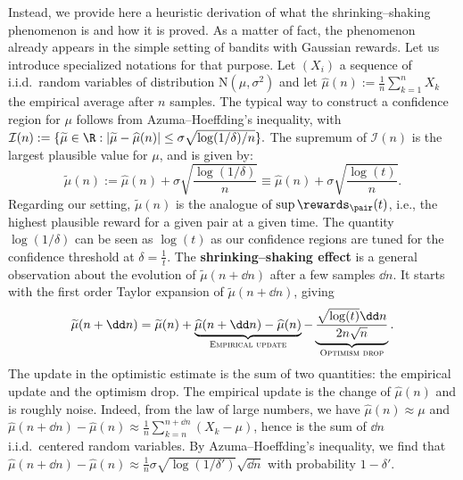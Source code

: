 \documentclass[preprint,cleveref,12pt]{colt2025}
\DeclarePairedDelimiter{\braces}{\{}{\}}	%
\DeclarePairedDelimiter{\abs}{\lvert}{\rvert}	%
\newcommand{\strong}[1]{\textbf{#1}}
\begin{document}
    Instead, we provide here a heuristic derivation of what the shrinking--shaking phenomenon is and how it is proved. 
    As a matter of fact, the phenomenon already appears in the simple setting of bandits with Gaussian rewards. 
    Let us introduce specialized notations for that purpose. 
    Let $(X_i)$ a sequence of i.i.d.~random variables of distribution $\mathrm{N}(\mu, \sigma^2)$ and let $\widehat{\mu}(n) := \frac 1n \sum_{k=1}^n X_k$ the empirical average after $n$ samples. 
    The typical way to construct a confidence region for $\mu$ follows from Azuma--Hoeffding's inequality, with
    $
        \mathcal{I}(n) 
        :=
        \braces{
            \widetilde{\mu} \in \R
            :
            \abs*{\widetilde{\mu} - \widehat{\mu}(n)}
            \le
            \sigma \sqrt{{\log(1/\delta)}/{n}}
        }
        .
    $
    The supremum of $\mathcal{I}(n)$ is the largest plausible value for $\mu$, and is given by:
    \begin{equation}
    \label{equation_ucb_index}
        \widetilde{\mu}(n) 
        := 
        \widehat{\mu}(n) + \sigma \sqrt{\frac{\log(1/\delta)}n}
        \equiv
        \widehat{\mu}(n) + \sigma \sqrt{\frac{\log(t)}n}
        .
    \end{equation}
    Regarding our setting, $\widetilde{\mu}(n)$ is the analogue of $\sup \rewards_\pair(t)$, i.e., the highest plausible reward for a given pair at a given time. 
    The quantity $\log(1/\delta)$ can be seen as $\log(t)$ as our confidence regions are tuned for the confidence threshold at $\delta = \frac 1t$.
    The \strong{shrinking--shaking effect} is a general observation about the evolution of $\widetilde{\mu}(n + \dd n)$ after a few samples $\dd n$. 
    It starts with the first order Taylor expansion of $\widetilde{\mu}(n + \dd n)$, giving
    \begin{equation}
    \label{equation_ucb_update}
        \widetilde{\mu}(n + \dd n)
        =
        \widetilde{\mu}(n) 
        + 
        \underbrace{
            \widehat{\mu}(n + \dd n) - \widehat{\mu}(n)
        }_{\textsc{Empirical update}}
        - 
        \underbrace{
            \frac{\sqrt{\log(t)} \dd n}{2 n \sqrt{n}}
        }_{\textsc{Optimism drop}}
        .
    \end{equation}
    The update in the optimistic estimate is the sum of two quantities: the empirical update and the optimism drop. 
    The empirical update is the change of $\widehat{\mu}(n)$ and is roughly noise. 
    Indeed, from the law of large numbers, we have $\widehat{\mu}(n) \approx \mu$ and $\widehat{\mu}(n + \dd n) - \widehat{\mu}(n) \approx \frac 1n \sum_{k=n}^{n + \dd n}(X_k - \mu)$, hence is the sum of $\dd n$ i.i.d.~centered random variables. 
    By Azuma--Hoeffding's inequality, we find that $\widehat{\mu}(n + \dd n) - \widehat{\mu}(n) \approx \frac 1n \sigma \sqrt{\log(1/\delta')} \sqrt{\dd n}$ with probability $1 - \delta'$. 
\end{document}
